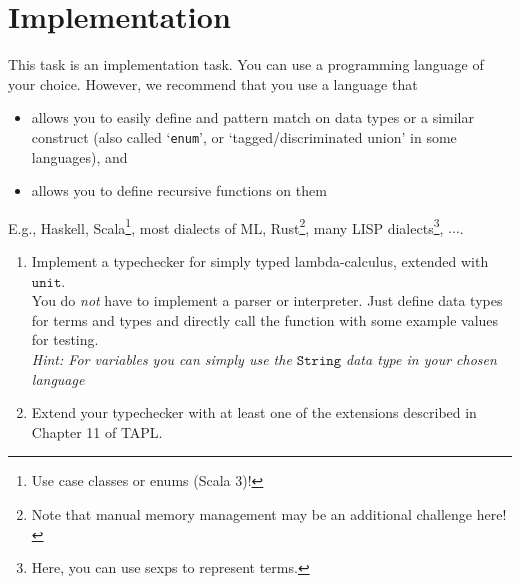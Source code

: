 \section{Implementation}
This task is an implementation task. 
You can use a programming language of your choice.
However, we recommend that you use a language that 
\begin{itemize}
  \item allows you to easily define and
    pattern match on data types or a similar construct (also called `\verb|enum|', or `tagged/discriminated union' in some languages), and
  \item allows you to define recursive functions on them
\end{itemize}
E.g.,
Haskell,
Scala\footnote{Use case classes or enums (Scala 3)!},
most dialects of ML, 
Rust\footnote{Note that manual memory management may be an additional challenge here!},
many LISP dialects\footnote{Here, you can use sexps to represent terms.},
$\dots$.

\begin{enumerate}
  \item Implement a typechecker for simply typed lambda-calculus, extended with $\mathtt{unit}$.\\
    You do \emph{not} have to implement a parser or interpreter. Just define data types for terms and types and directly call the function
    with some example values for testing.\\
    \emph{Hint: For variables you can simply use the $\mathtt{String}$ data type in your chosen language}
  \item Extend your typechecker with at least one of the extensions described in Chapter 11 of TAPL.
\end{enumerate}

